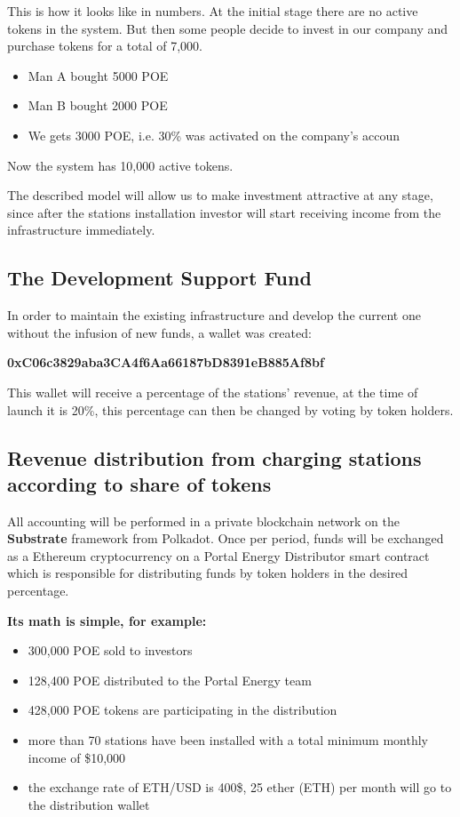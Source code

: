 \documentclass[a4paper,12pt]{report}
\begin{document}
This is how it looks like in numbers. At the initial stage there are no active tokens in the system.  But then some people  decide to invest in our company and purchase tokens for a total of 7,000.




\begin{itemize}
	\item Man A bought 5000 POE
	\item Man B bought 2000 POE
	\item We gets 3000 POE, i.e. 30\% was activated on the company's accoun
\end{itemize}

Now the system has 10,000 active tokens.

The described model will allow us to make investment attractive at any stage, since  after the stations installation  investor will start receiving income from the infrastructure immediately.


\subsection{The Development Support Fund}

In order to maintain the existing infrastructure and develop the current one without the infusion of  new funds, a wallet was created:

\textbf{0xC06c3829aba3CA4f6Aa66187bD8391eB885Af8bf}

This wallet will receive a percentage of the stations' revenue, at the time of launch it is 20\%, this percentage can then be changed by voting by token holders.


\subsection{Revenue distribution  from charging stations according to share of tokens }
\label{capital}

All accounting will be performed in a private blockchain network on the \textbf{Substrate} framework from Polkadot. Once per period, funds will be exchanged as a Ethereum cryptocurrency on a Portal Energy Distributor smart contract  which is responsible for distributing funds by token holders in the desired percentage.

\textbf{Its math is simple, for example:}

\begin{itemize}
	\item 300,000 POE sold to investors
	\item 128,400 POE distributed to the Portal Energy team
	\item 428,000 POE tokens are participating in the distribution
	\item more than 70 stations have been installed  with a total  minimum monthly income of \$10,000
	\item the exchange rate of ETH/USD is  400\$, 25 ether (ETH) per month will go  to the distribution wallet
\end{itemize}
\end{document}
